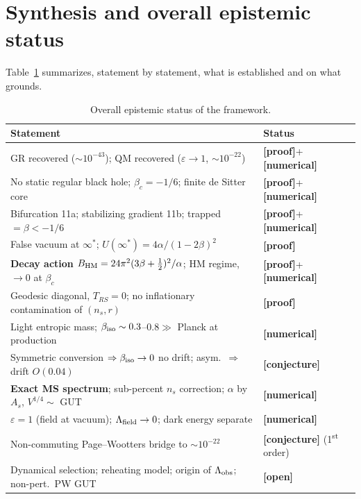 \documentclass[11pt,a4paper]{article}
\newcommand{\st}[1]{\textbf{\textcolor{blue!45!black}{[#1]}}}
\newcommand{\fpole}{\infty^*}
\begin{document}
\section{Synthesis and overall epistemic status}
Table~\ref{tab:statut} summarizes, statement by statement, what is established and on what grounds.
\begin{table}[ht]\centering\small
\begin{tabular}{p{}l}
\toprule
Statement & Status \\
\midrule
GR recovered ($\sim10^{-43}$); QM recovered ($\varepsilon\to1$, $\sim10^{-22}$) & \st{proof}+\st{numerical} \\
No static regular black hole; $\beta_c=-1/6$; finite de Sitter core & \st{proof}+\st{numerical} \\
Bifurcation 11a; stabilizing gradient 11b; trapped $=\beta<-1/6$ & \st{proof}+\st{numerical} \\
False vacuum at $\fpole$; $U(\fpole)=4\alpha/(1-2\beta)^2$ & \st{proof} \\
\textbf{Decay action} $B_{\rm HM}=24\pi^2(3\beta+\tfrac12)^2/\alpha$; HM regime, $\to0$ at $\beta_c$ & \st{proof}+\st{numerical} \\
Geodesic diagonal, $T_{RS}=0$; no inflationary contamination of $(n_s,r)$ & \st{proof} \\
Light entropic mass; $\beta_{\rm iso}\sim0.3$--$0.8\gg$ Planck at production & \st{numerical} \\
Symmetric conversion $\Rightarrow\beta_{\rm iso}\to0$ no drift; asym.\ $\Rightarrow$ drift $O(0.04)$ & \st{conjecture} \\
\textbf{Exact MS spectrum}; sub-percent $n_s$ correction; $\alpha$ by $A_s$, $V^{1/4}\!\sim$ GUT & \st{numerical} \\
$\varepsilon=1$ (field at vacuum); $\Lambda_{\rm field}\to0$; dark energy separate & \st{numerical} \\
Non-commuting Page--Wootters bridge to $\sim10^{-22}$ & \st{conjecture} (1\textsuperscript{st} order) \\
Dynamical selection; reheating model; origin of $\Lambda_{\rm obs}$; non-pert.\ PW GUT & \st{open} \\
\bottomrule
\end{tabular}
\caption{\small Overall epistemic status of the framework.}\label{tab:statut}
\end{table}
\end{document}
